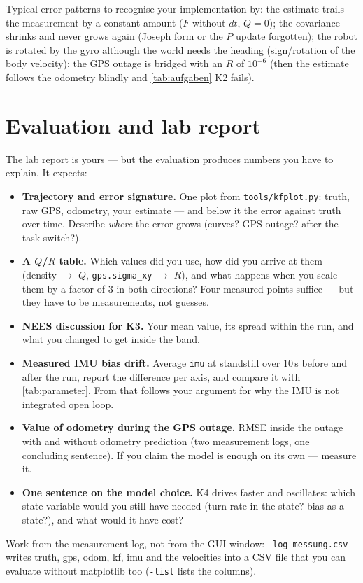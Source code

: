 \documentclass[12pt,a4paper]{scrartcl}
\newcommand{\thema}[1]{\texttt{#1}}
\newcommand{\ordner}[1]{\texttt{#1}}
\newcommand{\kommando}[1]{\texttt{#1}}
\begin{document}
Typical error patterns to recognise your implementation by: the estimate trails the
measurement by a constant amount (\(F\) without \(dt\), \(Q=0\)); the covariance shrinks and
never grows again (Joseph form or the \(P\) update forgotten); the robot is rotated by the
gyro although the world needs the heading (sign/rotation of the body
velocity); the GPS outage is bridged with an \(R\) of \(10^{-6}\) (then
the estimate follows the odometry blindly and \cref{tab:aufgaben} K2 fails).

\section{Evaluation and lab report}\label{sec:bericht}
The lab report is yours — but the evaluation produces numbers you have to explain. It
expects:
\begin{itemize}
  \item \textbf{Trajectory and error signature.} One plot from \ordner{tools/kfplot.py}: truth,
    raw GPS, odometry, your estimate — and below it the error against truth over time.
    Describe \emph{where} the error grows (curves? GPS outage? after the task switch?).
  \item \textbf{A \(Q\)/\(R\) table.} Which values did you use, how did you arrive at them
    (density \(\to\) \(Q\), \thema{gps.sigma\_xy} \(\to\) \(R\)), and what happens when you
    scale them by a factor of 3 in both directions? Four measured points suffice — but they
    have to be measurements, not guesses.
  \item \textbf{NEES discussion for K3.} Your mean value, its spread within the run, and what
    you changed to get inside the band.
  \item \textbf{Measured IMU bias drift.} Average \thema{imu} at standstill over 10\,s before
    and after the run, report the difference per axis, and compare it with
    \cref{tab:parameter}. From that follows your argument for why the IMU is not
    integrated open loop.
  \item \textbf{Value of odometry during the GPS outage.} RMSE inside the outage with and
    without odometry prediction (two measurement logs, one concluding sentence). If you claim
    the model is enough on its own — measure it.
  \item \textbf{One sentence on the model choice.} K4 drives faster and oscillates: which
    state variable would you still have needed (turn rate in the state? bias as a state?),
    and what would it have cost?
\end{itemize}
Work from the measurement log, not from the GUI window: \kommando{--log messung.csv}
writes truth, gps, odom, kf, imu and the velocities into a CSV file that you can evaluate
without matplotlib too (\kommando{-\-list} lists the columns).
\end{document}
